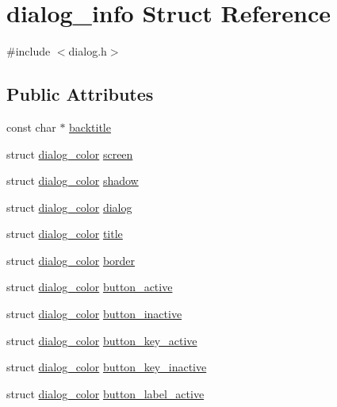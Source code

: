 \hypertarget{structdialog__info}{\section{dialog\-\_\-info Struct Reference}
\label{structdialog__info}
}


{\ttfamily \#include $<$dialog.\-h$>$}

\subsection*{Public Attributes}
\begin{DoxyCompactItemize}
\item 
const char $\ast$ \hyperlink{structdialog__info_a9f1a0fbe65d687a77b55de0838aded99}{backtitle}
\item 
struct \hyperlink{structdialog__color}{dialog\-\_\-color} \hyperlink{structdialog__info_a06e2a48a2315b805319ed20642e614cc}{screen}
\item 
struct \hyperlink{structdialog__color}{dialog\-\_\-color} \hyperlink{structdialog__info_a99ef49fd11e20b8abcd7afd043d56f45}{shadow}
\item 
struct \hyperlink{structdialog__color}{dialog\-\_\-color} \hyperlink{structdialog__info_a0b2621037998c327e6a4a4ea9a6edd0d}{dialog}
\item 
struct \hyperlink{structdialog__color}{dialog\-\_\-color} \hyperlink{structdialog__info_acd8d65b2193ac08bff8b6deb3d2b08da}{title}
\item 
struct \hyperlink{structdialog__color}{dialog\-\_\-color} \hyperlink{structdialog__info_a4d23511fa929b3c50042cce4044a56ed}{border}
\item 
struct \hyperlink{structdialog__color}{dialog\-\_\-color} \hyperlink{structdialog__info_afbdc441019b4745607c4fbca304b69f4}{button\-\_\-active}
\item 
struct \hyperlink{structdialog__color}{dialog\-\_\-color} \hyperlink{structdialog__info_a93ea9a7c783c4b085247fd774381ef8c}{button\-\_\-inactive}
\item 
struct \hyperlink{structdialog__color}{dialog\-\_\-color} \hyperlink{structdialog__info_a29a8048b71e75c643b8d504a45337ba6}{button\-\_\-key\-\_\-active}
\item 
struct \hyperlink{structdialog__color}{dialog\-\_\-color} \hyperlink{structdialog__info_acaae57c4e61c359d1d84fdfbbcdf14aa}{button\-\_\-key\-\_\-inactive}
\item 
struct \hyperlink{structdialog__color}{dialog\-\_\-color} \hyperlink{structdialog__info_a37fa633aa4b3673a98a70ca639049460}{button\-\_\-label\-\_\-active}

\end{DoxyCompactItemize}
